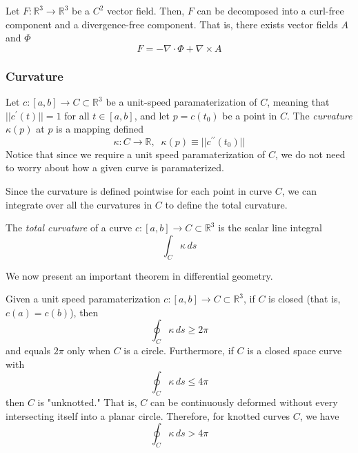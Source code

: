   \begin{theorem}
		Let $F: \mathbb{R}^3 \longrightarrow \mathbb{R}^3$ be a $C^2$ vector field. Then, $F$ can be decomposed into a curl-free component and a divergence-free component. That is, there exists vector fields $A$ and $\Phi$
		\begin{equation}
			F = - \nabla \cdot \Phi + \nabla \times A
		\end{equation}
  \end{theorem}

\subsubsection{Curvature}

  \begin{definition}
		Let $c: [a, b] \longrightarrow C \subset \mathbb{R}^3$ be a unit-speed paramaterization of $C$, meaning that $||c^\prime (t)|| = 1$ for all $t \in [a,b]$, and let $p = c(t_0)$ be a point in $C$. The \textit{curvature} $\kappa(p)$ at $p$ is a mapping defined
		\begin{equation}
			\kappa: C \longrightarrow \mathbb{R}, \;\; \kappa(p) \equiv ||c^{\prime \prime} (t_0)||
		\end{equation}
		Notice that since we require a unit speed paramaterization of $C$, we do not need to worry about how a given curve is paramaterized. 
  \end{definition}

  Since the curvature is defined pointwise for each point in curve $C$, we can integrate over all the curvatures in $C$ to define the total curvature. 

  \begin{definition}
		The \textit{total curvature} of a curve $c: [a,b] \longrightarrow C \subset \mathbb{R}^3$ is the scalar line integral 
		\begin{equation}
			\int_C \kappa \, ds
		\end{equation}
  \end{definition}

  We now present an important theorem in differential geometry. 

  \begin{theorem}
		Given a unit speed paramaterization $c: [a,b] \longrightarrow C \subset \mathbb{R}^3$, if $C$ is closed (that is, $c(a)=c(b)$), then 
		\begin{equation}
			\oint_C \kappa\, ds \geq 2 \pi
		\end{equation}
		and equals $2\pi$ only when $C$ is a circle. Furthermore, if $C$ is a closed space curve with 
		\begin{equation}
			\oint_C \kappa\, ds \leq 4\pi
		\end{equation}
		then $C$ is "unknotted." That is, $C$ can be continuously deformed without every intersecting itself into a planar circle. Therefore, for knotted curves $C$, we have
		\begin{equation}
			\oint_C \kappa \, ds > 4\pi
		\end{equation}
  \end{theorem}

